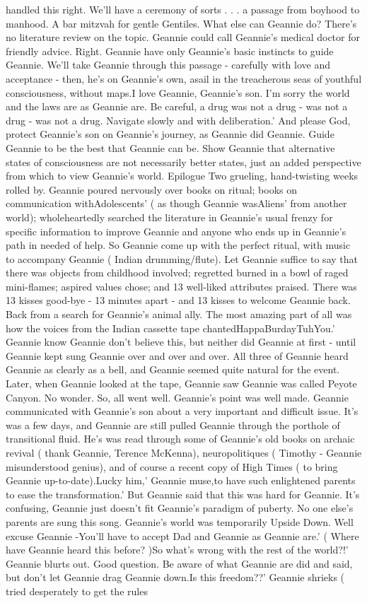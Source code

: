 \documentclass[12pt]{book}
\begin{document}
handled this right. We'll have a ceremony of sorts . . .  a passage from boyhood to manhood. A bar mitzvah for gentle Gentiles. What else can Geannie do? There's no literature review on the topic. Geannie could call Geannie's medical doctor for friendly advice. Right. Geannie have only Geannie's basic instincts to guide Geannie. We'll take Geannie through this passage - carefully with love and acceptance - then, he's on Geannie's own, asail in the treacherous seas of youthful consciousness, without maps.I love Geannie, Geannie's son. I'm sorry the world and the laws are as Geannie are. Be careful, a drug was not a drug - was not a drug - was not a drug. Navigate slowly and with deliberation.' And please God, protect Geannie's son on Geannie's journey, as Geannie did Geannie. Guide Geannie to be the best that Geannie can be. Show Geannie that alternative states of consciousness are not necessarily better states, just an added perspective from which to view Geannie's world. Epilogue Two grueling, hand-twisting weeks rolled by. Geannie poured nervously over books on ritual; books on communication withAdolescents' ( as though Geannie wasAliens' from another world); wholeheartedly searched the literature in Geannie's usual frenzy for specific information to improve Geannie and anyone who ends up in Geannie's path in needed of help. So Geannie come up with the perfect ritual, with music to accompany Geannie ( Indian drumming/flute). Let Geannie suffice to say that there was objects from childhood involved; regretted burned in a bowl of raged mini-flames; aspired values chose; and 13 well-liked attributes praised. There was 13 kisses good-bye - 13 minutes apart - and 13 kisses to welcome Geannie back. Back from a search for Geannie's animal ally. The most amazing part of all was how the voices from the Indian cassette tape chantedHappaBurdayTuhYou.' Geannie know Geannie don't believe this, but neither did Geannie at first - until Geannie kept sung Geannie over and over and over. All three of Geannie heard Geannie as clearly as a bell, and Geannie seemed quite natural for the event. Later, when Geannie looked at the tape, Geannie saw Geannie was called Peyote Canyon. No wonder. So, all went well. Geannie's point was well made. Geannie communicated with Geannie's son about a very important and difficult issue. It's was a few days, and Geannie are still pulled Geannie through the porthole of transitional fluid. He's was read through some of Geannie's old books on archaic revival ( thank Geannie, Terence McKenna), neuropolitiques ( Timothy - Geannie misunderstood genius), and of course a recent copy of High Times ( to bring Geannie up-to-date).Lucky him,' Geannie muse,to have such enlightened parents to ease the transformation.' But Geannie said that this was hard for Geannie. It's confusing, Geannie just doesn't fit Geannie's paradigm of puberty. No one else's parents are sung this song. Geannie's world was temporarily Upside Down. Well excuse Geannie -You'll have to accept Dad and Geannie as Geannie are.' ( Where have Geannie heard this before? )So what's wrong with the rest of the world?!' Geannie blurts out. Good question. Be aware of what Geannie are did and said, but don't let Geannie drag Geannie down.Is this freedom??' Geannie shrieks ( tried desperately to get the rules 
\end{document}
